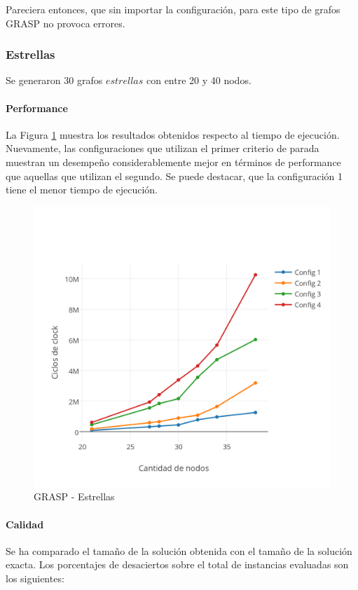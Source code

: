 Pareciera entonces, que sin importar la configuración, para este tipo de grafos GRASP no provoca errores.
\subsubsection{Estrellas}

Se generaron 30 grafos $estrellas$ con entre 20 y 40 nodos.

\paragraph{Performance}

La Figura \ref{fig:4B} muestra los resultados obtenidos respecto al tiempo de ejecución. Nuevamente, las configuraciones que utilizan el primer criterio de parada muestran un desempeño considerablemente mejor en términos de performance que aquellas que utilizan el segundo.
Se puede destacar, que la configuración 1 tiene el menor tiempo de ejecución.

\begin{figure}[htb]
	\begin{center}
    		\includegraphics[scale=0.8]{imagenes/grasp-estrellas-tiempo.png}
	\end{center}
	\caption{GRASP - Estrellas}\label{fig:4B}
\end{figure}

\paragraph{Calidad} Se ha comparado el tamaño de la solución obtenida con el tamaño de la solución exacta. Los porcentajes de desaciertos sobre el total de instancias evaluadas son los siguientes:

